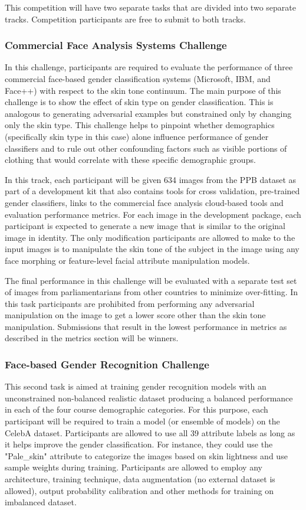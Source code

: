 \documentclass[11pt, oneside]{article}
\begin{document}
This competition will have two separate tasks that are divided into two 
separate tracks. Competition participants are free to submit to both tracks.

\subsubsection{Commercial Face Analysis Systems Challenge}
In this challenge, participants are required to evaluate the performance of 
three commercial face-based gender classification systems (Microsoft, IBM, and 
Face++) with respect to the skin tone continuum. The main purpose of this 
challenge is to show the effect of skin type on gender classification. This is 
analogous to generating adversarial examples but constrained only by changing 
only the skin type. This challenge helps to pinpoint whether demographics 
(specifically skin type in this case) alone influence performance of gender 
classifiers and to rule out other confounding factors such as visible portions 
of clothing that would correlate with these specific demographic groups.

In this track, each participant will be given 634 images from the PPB dataset 
as part of a development kit that also contains tools for cross validation, 
pre-trained gender classifiers, links to the commercial face analysis 
cloud-based tools and evaluation performance metrics. For each image in the 
development package, each participant is expected to generate a new image that is 
similar to the original image in identity. The only modification participants 
are allowed to make to the input images is to manipulate the skin tone of the 
subject in the image using any face morphing or feature-level facial attribute 
manipulation models.

The final performance in this challenge will be evaluated with a separate test 
set of images from parliamentarians from other countries to minimize 
over-fitting. In this task participants are prohibited from performing any 
adversarial manipulation on the image to get a lower score other than the skin 
tone manipulation. Submissions that result in the lowest performance in metrics 
as described in the metrics section will be winners.

\subsubsection{Face-based Gender Recognition Challenge}
This second task is aimed at training gender recognition models with an 
unconstrained non-balanced realistic dataset producing a balanced performance 
in each of the four course demographic categories. For this purpose, each 
participant will be required to train a model (or ensemble of models) on the CelebA 
dataset. Participants are allowed to use all 39 attribute labels as long as 
it helps improve the gender classification. For instance, they could use the 
"Pale\_skin" attribute to categorize the images based on skin lightness and use 
sample weights during training. Participants are allowed to employ any 
architecture, training technique, data augmentation (no external dataset is 
allowed), output probability calibration and other methods for training on 
imbalanced dataset.
\end{document}
